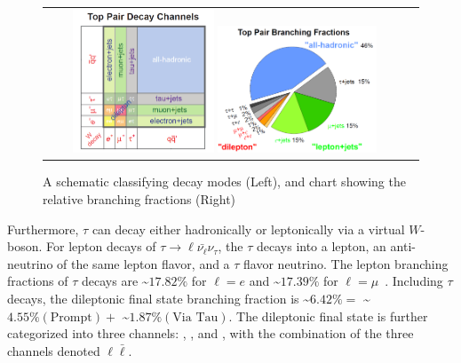 \begin{figure}[!htb]
  \begin{center}
    \begin{tabular}{cc}
        \includegraphics[width=0.40\textwidth]{fig_TopQuark/Top_Pair_Decay_Channels.png}
        \includegraphics[width=0.45\textwidth]{fig_TopQuark/Top_Pair_Branching_Fractions.png}
    \end{tabular}
    \caption{A schematic classifying \ttbar decay modes (Left), and chart showing the relative branching fractions (Right)~\cite{d0_diagrams}
            }
    \label{Top_Pair_Decay_Channels}
  \end{center}
\end{figure}

Furthermore, $\tau$ can decay either hadronically or leptonically via a virtual $W$-boson.
For lepton decays of $\tau \rightarrow \ell \bar{\nu_\ell} \nu_\tau$, the $\tau$ decays into a lepton, an anti-neutrino of the same lepton flavor, and a $\tau$ flavor neutrino.
The lepton branching fractions of $\tau$ decays are \sim$17.82 \%$ for $\ell = e$ and \sim$17.39 \%$ for $\ell = \mu$~\cite{bib:PDG}.
Including $\tau$ decays, the \ttbar dileptonic final state branching fraction is \sim$6.42 \% = $ \sim$4.55 \% (\text{Prompt}) + $ \sim$1.87 \% (\text{Via Tau})$.
The \ttbar dileptonic final state is further categorized into three channels: \ee, \emu, and \mumu, with the combination of the three channels denoted $\ell \bar{\ell}$.


